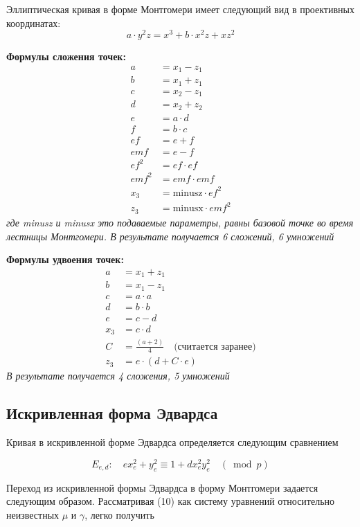 Эллиптическая кривая в форме Монтгомери имеет следующий вид в проективных координатах:
\begin{equation*}
a \cdot y^2z = x^3 + b \cdot x^2z + xz^2
\end{equation*}

\textbf{Формулы сложения точек:~\cite{montgomery-formulas}}
\begin{align*}
a &= x_1 - z_1 \\
b &= x_1 + z_1 \\
c &= x_2 - z_1 \\
d &= x_2 + z_2 \\
e &= a \cdot d \\
f &= b \cdot c \\
ef &= e + f \\
emf &= e - f \\
ef^2 &= ef \cdot ef \\
emf^2 &= emf \cdot emf \\
x_3 &= \text{minusz} \cdot ef^2 \\
z_3 &= \text{minusx} \cdot emf^2
\end{align*}
\textit{где minusz и minusx это подаваемые параметры, равны базовой точке во время лестницы Монтгомери. В результате получается 6 сложений, 6 умножений}

\textbf{Формулы удвоения точек:~\cite{montgomery-formulas}}
\begin{align*}
a &= x_1 + z_1 \\
b &= x_1 - z_1 \\
c &= a \cdot a \\
d &= b \cdot b \\
e &= c - d \\
x_3 &= c \cdot d \\
C &= \frac{(a + 2)}{4} \quad \text{(считается заранее)} \\
z_3 &= e \cdot (d + C \cdot e) 
\end{align*}
\textit{В результате получается 4 сложения, 5 умножений}



\subsection{Искривленная форма Эдвардса}
Кривая в искривленной форме Эдвардса определяется следующим сравнением ~\cite{edwards-curve}

$$
E_{e, d}: \quad e x_{e}^{2}+y_{e}^{2} \equiv 1+d x_{e}^{2} y_{e}^{2} \quad(\bmod p)
$$

Переход из искривленной формы Эдвардса в форму Монтгомери задается следующим образом. Рассматривая (10) как систему уравнений относительно неизвестных $\mu$ и $\gamma$, легко получить

